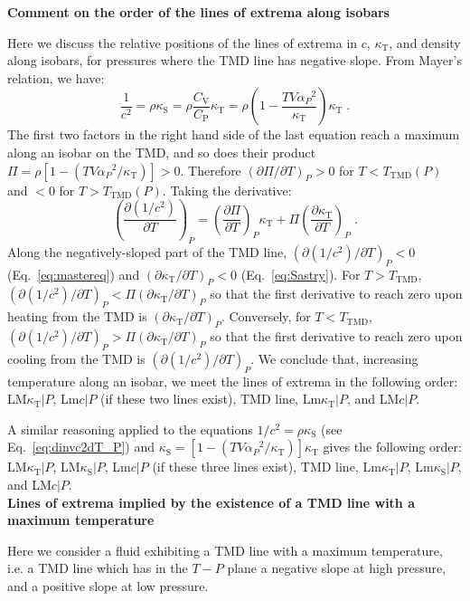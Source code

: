 \documentclass[12pt]{article}
\newcommand{\mrm}{\mathrm}
\newcommand{\kT}{\kappa_\mrm{T}}
\newcommand{\kS}{\kappa_\mrm{S}}
\newcommand{\CP}{C_\mrm{P}}
\newcommand{\CV}{C_\mrm{V}}
\begin{document}
\textbf{Comment on the order of the lines of extrema along isobars}

Here we discuss the relative positions of the lines of extrema in $c$, $\kT$, and density along isobars, for pressures where the TMD line has negative slope. From Mayer's relation, we have:
\begin{equation}
\frac{1}{c^2} = \rho \kS = \rho \frac{\CV}{\CP} \kT = \rho \left(1 - \frac{TV {\alpha_P}^2}{\kT} \right) \kT\; .
\end{equation}
The first two factors in the right hand side of the last equation reach a maximum along an isobar on the TMD, and so does their product $\Pi = \rho [1 - (TV {\alpha_P}^2 /\kT)] >0$. Therefore $(\partial \Pi/\partial T)_P >0$ for $T<T_\mrm{TMD}(P)$ and $<0$ for $T>T_\mrm{TMD}(P)$.
Taking the derivative:
\begin{equation}
\left( \frac{\partial (1/c^2)}{\partial T}\right)_P = \left( \frac{\partial \Pi}{\partial T}\right)_P \kT + \Pi \left( \frac{\partial \kT}{\partial T}\right)_P  \; .
\label{eq:dinvc2dT_P3}
\end{equation}
Along the negatively-sloped part of the TMD line, $(\partial (1/c^2) / \partial T )_P < 0$ (Eq.~\ref{eq:mastereq}) and $(\partial \kT / \partial T )_P <0$ (Eq.~\ref{eq:Sastry}). For $T>T_\mrm{TMD}$, $(\partial (1/c^2) / \partial T )_P < \Pi (\partial \kT / \partial T )_P$ so that the first derivative to reach zero upon heating from the TMD is $(\partial \kT / \partial T )_P$. Conversely, for $T<T_\mrm{TMD}$, $(\partial (1/c^2) / \partial T )_P > \Pi (\partial \kT / \partial T )_P$ so that the first derivative to reach zero upon cooling from the TMD is $(\partial (1/c^2) / \partial T )_P$. We conclude that, increasing temperature along an isobar, we meet the lines of extrema in the following order: LM$\kT|P$, Lm$c|P$ (if these two lines exist), TMD line, Lm$\kT|P$, and LM$c|P$.

A similar reasoning applied to the equations $1/c^2 = \rho \kS$ (see Eq.~\ref{eq:dinvc2dT_P}) and $\kS = [1 - (TV {\alpha_P}^2 /\kT)] \kT$ gives the following order: LM$\kT|P$, LM$\kS|P$, Lm$c|P$ (if these three lines exist), TMD line, Lm$\kT|P$, Lm$\kS|P$, and LM$c|P$.\\

\textbf{Lines of extrema implied by the existence of a TMD line with a maximum temperature}

Here we consider a fluid exhibiting a TMD line with a maximum temperature, i.e. a TMD line which has in the $T-P$ plane a negative slope at high pressure, and a positive slope at low pressure.
\end{document}
